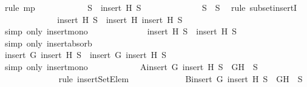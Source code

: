 \begin{isabellebody}
\ {\isacharparenleft}rule\ mp{\isacharparenright}\isanewline
\ \ \ \ \ \ \ \ \ \ \isamarkupfalse%
\ {\isachardoublequoteopen}S{\isacharprime}\ {\isasymsubseteq}\ insert\ H\ S{\isachardoublequoteclose}\isanewline
\ \ \ \ \ \ \ \ \ \ \ \ \isamarkupfalse%
\ {\isacartoucheopen}S{\isacharprime}\ {\isasymsubseteq}\ S{\isacartoucheclose}\ \isamarkupfalse%
\ {\isacharparenleft}rule\ subset{\isacharunderscore}insertI{}{\isacharparenright}\ \isanewline
\ \ \ \ \ \ \ \ \ \ \isamarkupfalse%
\ \isamarkupfalse%
\ {\isachardoublequoteopen}insert\ H\ S{\isacharprime}\ {\isasymsubseteq}\ insert\ H\ {\isacharparenleft}insert\ H\ S{\isacharparenright}{\isachardoublequoteclose}\isanewline
\ \ \ \ \ \ \ \ \ \ \ \ \isamarkupfalse%
\ {\isacharparenleft}simp\ only{\isacharcolon}\ insert{\isacharunderscore}mono{\isacharparenright}\isanewline
\ \ \ \ \ \ \ \ \ \ \isamarkupfalse%
\ \isamarkupfalse%
\ {\isachardoublequoteopen}insert\ H\ S{\isacharprime}\ {\isasymsubseteq}\ insert\ H\ S{\isachardoublequoteclose}\isanewline
\ \ \ \ \ \ \ \ \ \ \ \ \isamarkupfalse%
\ {\isacharparenleft}simp\ only{\isacharcolon}\ insert{\isacharunderscore}absorb{}{\isacharparenright}\isanewline
\ \ \ \ \ \ \ \ \ \ \isamarkupfalse%
\ \isamarkupfalse%
\ {\isachardoublequoteopen}insert\ G\ {\isacharparenleft}insert\ H\ S{\isacharprime}{\isacharparenright}\ {\isasymsubseteq}\ insert\ G\ {\isacharparenleft}insert\ H\ S{\isacharparenright}{\isachardoublequoteclose}\isanewline
\ \ \ \ \ \ \ \ \ \ \ \ \isamarkupfalse%
\ {\isacharparenleft}simp\ only{\isacharcolon}\ insert{\isacharunderscore}mono{\isacharparenright}\isanewline
\ \ \ \ \ \ \ \ \ \ \isamarkupfalse%
\ A{\isacharcolon}{\isachardoublequoteopen}insert\ G\ {\isacharparenleft}insert\ H\ S{\isacharprime}{\isacharparenright}\ {\isacharequal}\ {\isacharbraceleft}G{\isacharcomma}H{\isacharbraceright}\ {\isasymunion}\ S{\isacharprime}{\isachardoublequoteclose}\isanewline
\ \ \ \ \ \ \ \ \ \ \ \ \isamarkupfalse%
\ {\isacharparenleft}rule\ insertSetElem{\isacharparenright}\ \isanewline
\ \ \ \ \ \ \ \ \ \ \isamarkupfalse%
\ B{\isacharcolon}{\isachardoublequoteopen}insert\ G\ {\isacharparenleft}insert\ H\ S{\isacharparenright}\ {\isacharequal}\ {\isacharbraceleft}G{\isacharcomma}H{\isacharbraceright}\ {\isasymunion}\ S{\isachardoublequoteclose}\isanewline
\ \ \ \ \ \ \ \ \ \ \ \ \isamarkupfalse%

\end{isabellebody}
